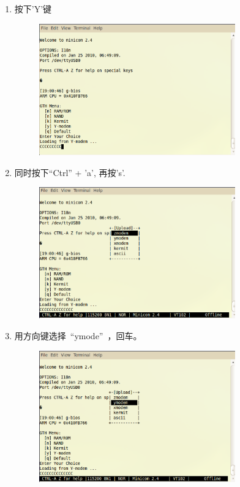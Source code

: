\documentclass[a4paper,11pt]{book}
\begin{document}
\begin{CJK*}{UTF8}{gbsn}
\begin{enumerate}
\begin{enumerate}
\begin{figure}[H]
	\end{figure}
	\item 按下'Y'键
		\begin{figure}[H]
		\centering
		\includegraphics[width=0.8\textwidth]{image/min_02.eps}
		\end{figure}
	\item 同时按下``Ctrl'' + 'a', 再按's'.
		\begin{figure}[H]
		\centering
		\includegraphics[width=0.8\textwidth]{image/min_03.eps}
		\end{figure}
	\item 用方向键选择~``ymode''~，回车。
		\begin{figure}[H]
		\centering
		\includegraphics[width=0.8\textwidth]{image/min_04.eps}

\end{figure}
\end{enumerate}
\end{enumerate}
\end{CJK*}
\end{document}
